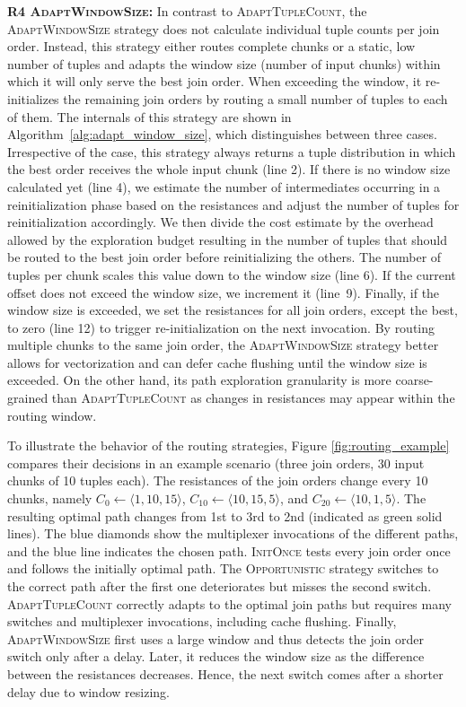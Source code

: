 \textbf{R4 \textsc{AdaptWindowSize}:} In contrast to \textsc{AdaptTupleCount}, the \textsc{AdaptWindowSize} strategy does not calculate individual tuple counts per join order. Instead, this strategy either routes complete chunks or a static, low number of tuples and adapts the window size (\ie number of input chunks) within which it will only serve the best join order. When exceeding the window, it re-initializes the remaining join orders by routing a small number of tuples to each of them. The internals of this strategy are shown in Algorithm~\ref{alg:adapt_window_size}, which distinguishes between three cases. Irrespective of the case, this strategy always returns a tuple distribution in which the best order receives the whole input chunk (line 2). If there is no window size calculated yet (line 4), we estimate the number of intermediates occurring in a reinitialization phase based on the resistances and adjust the number of tuples for reinitialization accordingly. We then divide the cost estimate by the overhead allowed by the exploration budget resulting in the number of tuples that should be routed to the best join order before reinitializing the others. The number of tuples per chunk scales this value down to the window size (line 6). If the current offset does not exceed the window size, we increment it (line~9). Finally, if the window size is exceeded, we set the resistances for all join orders, except the best, to zero (line 12) to trigger re-initialization on the next invocation. By routing multiple chunks to the same join order, the \textsc{AdaptWindowSize} strategy better allows for vectorization and can defer cache flushing until the window size is exceeded. On the other hand, its path exploration granularity is more coarse-grained than \textsc{AdaptTupleCount} as changes in resistances may appear within the routing window.

\begin{example2} To illustrate the behavior of the routing strategies, Figure \ref{fig:routing_example} compares their  decisions in an example scenario (three join orders, 30 input chunks of 10 tuples each). The resistances of the join orders change every 10 chunks, namely $C_0 \gets \langle 1, 10, 15 \rangle$, $C_{10} \gets \langle 10, 15, 5 \rangle$, and $C_{20} \gets \langle 10, 1, 5 \rangle$. The resulting optimal path changes from 1st to 3rd to 2nd (indicated as green solid lines). The blue diamonds show the multiplexer invocations of the different paths, and the blue line indicates the chosen path. \textsc{Init\-Once} tests every join order once and follows the initially optimal path. The \textsc{Opportunistic} strategy switches to the correct path after the first one deteriorates but misses the second switch. \textsc{AdaptTupleCount} correctly adapts to the optimal join paths but requires many switches and multiplexer invocations, including cache flushing. Finally, \textsc{AdaptWindowSize} first uses a large window and thus detects the join order switch only after a delay. Later, it reduces the window size as the difference between the resistances decreases. Hence, the next switch comes after a shorter delay due to window resizing.
\end{example2}

